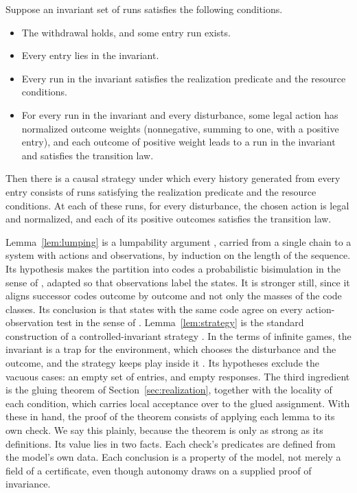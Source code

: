\begin{lemma}
\label{lem:strategy}
Suppose an invariant set of runs satisfies the following conditions.
\begin{itemize}
\item The withdrawal holds, and some entry run exists.
\item Every entry lies in the invariant.
\item Every run in the invariant satisfies the realization predicate and the
resource conditions.
\item For every run in the invariant and every disturbance, some legal action
has normalized outcome weights (nonnegative, summing to one, with a positive
entry), and each outcome of positive weight leads to a run in the invariant
and satisfies the transition law.
\end{itemize}
Then there is a causal strategy under which every history generated from every
entry consists of runs satisfying the realization predicate and the resource
conditions. At each of these runs, for every disturbance, the chosen action is
legal and normalized, and each of its positive outcomes satisfies the
transition law.
\end{lemma}

Lemma~\ref{lem:lumping} is a lumpability argument \citep{KemenySnell1976},
carried from a single chain to a system with actions and observations, by
induction on the length of the sequence. Its hypothesis makes the partition
into codes a probabilistic bisimulation in the sense of \citet{LarsenSkou1991},
adapted so that observations label the states. It is stronger still, since it aligns
successor codes outcome by outcome and not only the masses of the code
classes. Its conclusion is that states with the same code agree on every
action-observation test in the sense of \citet{LittmanSuttonSingh2002}.
Lemma~\ref{lem:strategy} is the standard construction of a
controlled-invariant strategy \citep{Blanchini1999, AubinBayenSaintPierre2011}.
In the terms of infinite games, the invariant is a trap for the environment,
which chooses the disturbance and the outcome, and the strategy keeps play
inside it \citep[p.~36]{Mazala2002}.
Its hypotheses exclude the vacuous cases: an empty set of entries, and empty
responses. The third ingredient is the gluing theorem of
Section~\ref{sec:realization}, together with the locality of each
condition, which carries local acceptance over to the glued assignment. With
these in hand, the proof of the theorem consists of applying each lemma to its
own check. We say this plainly, because the theorem is only as strong as its
definitions. Its value lies in two facts. Each check's predicates are defined from the
model's own data. Each conclusion is a property of the model, not merely a field
of a certificate, even though autonomy draws on a supplied proof of invariance.

